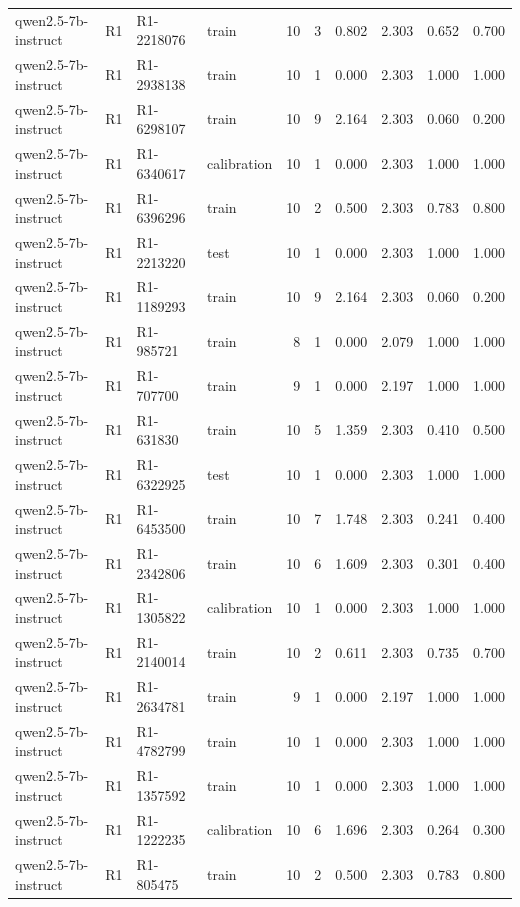 \begin{table}
\begin{tabular}{llllrrrrrr}
qwen2.5-7b-instruct & R1 & R1-2218076 & train & 10 & 3 & 0.802 & 2.303 & 0.652 & 0.700 \\
qwen2.5-7b-instruct & R1 & R1-2938138 & train & 10 & 1 & 0.000 & 2.303 & 1.000 & 1.000 \\
qwen2.5-7b-instruct & R1 & R1-6298107 & train & 10 & 9 & 2.164 & 2.303 & 0.060 & 0.200 \\
qwen2.5-7b-instruct & R1 & R1-6340617 & calibration & 10 & 1 & 0.000 & 2.303 & 1.000 & 1.000 \\
qwen2.5-7b-instruct & R1 & R1-6396296 & train & 10 & 2 & 0.500 & 2.303 & 0.783 & 0.800 \\
qwen2.5-7b-instruct & R1 & R1-2213220 & test & 10 & 1 & 0.000 & 2.303 & 1.000 & 1.000 \\
qwen2.5-7b-instruct & R1 & R1-1189293 & train & 10 & 9 & 2.164 & 2.303 & 0.060 & 0.200 \\
qwen2.5-7b-instruct & R1 & R1-985721 & train & 8 & 1 & 0.000 & 2.079 & 1.000 & 1.000 \\
qwen2.5-7b-instruct & R1 & R1-707700 & train & 9 & 1 & 0.000 & 2.197 & 1.000 & 1.000 \\
qwen2.5-7b-instruct & R1 & R1-631830 & train & 10 & 5 & 1.359 & 2.303 & 0.410 & 0.500 \\
qwen2.5-7b-instruct & R1 & R1-6322925 & test & 10 & 1 & 0.000 & 2.303 & 1.000 & 1.000 \\
qwen2.5-7b-instruct & R1 & R1-6453500 & train & 10 & 7 & 1.748 & 2.303 & 0.241 & 0.400 \\
qwen2.5-7b-instruct & R1 & R1-2342806 & train & 10 & 6 & 1.609 & 2.303 & 0.301 & 0.400 \\
qwen2.5-7b-instruct & R1 & R1-1305822 & calibration & 10 & 1 & 0.000 & 2.303 & 1.000 & 1.000 \\
qwen2.5-7b-instruct & R1 & R1-2140014 & train & 10 & 2 & 0.611 & 2.303 & 0.735 & 0.700 \\
qwen2.5-7b-instruct & R1 & R1-2634781 & train & 9 & 1 & 0.000 & 2.197 & 1.000 & 1.000 \\
qwen2.5-7b-instruct & R1 & R1-4782799 & train & 10 & 1 & 0.000 & 2.303 & 1.000 & 1.000 \\
qwen2.5-7b-instruct & R1 & R1-1357592 & train & 10 & 1 & 0.000 & 2.303 & 1.000 & 1.000 \\
qwen2.5-7b-instruct & R1 & R1-1222235 & calibration & 10 & 6 & 1.696 & 2.303 & 0.264 & 0.300 \\
qwen2.5-7b-instruct & R1 & R1-805475 & train & 10 & 2 & 0.500 & 2.303 & 0.783 & 0.800 \\

\end{tabular}
\end{table}
